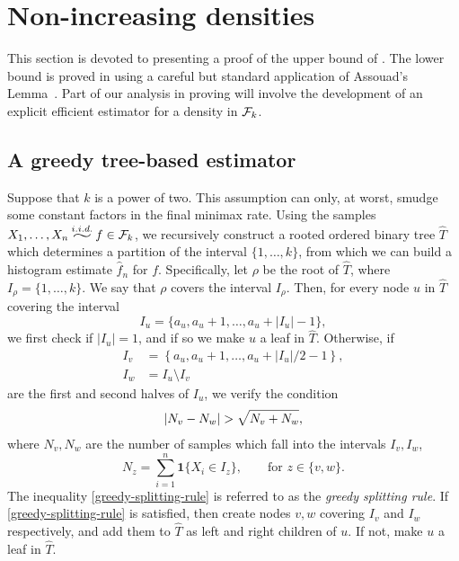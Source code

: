 \section{Non-increasing densities}

This section is devoted to presenting a proof of the upper bound of
. The lower bound is proved in
 using a careful but standard application of
Assouad's Lemma~\cite{assouad}. Part of our analysis in proving
 will involve the development of an explicit
efficient estimator for a density in $\mathcal{F}_k$.

\subsection{A greedy tree-based estimator}

Suppose that $k$ is a power of two. This assumption can only, at
worst, smudge some constant factors in the final minimax rate. Using
the samples $X_1, \dots, X_n \iid f \in \sF_k$, we recursively
construct a rooted ordered binary tree $\widehat{T}$ which determines
a partition of the interval $\{1, \dots, k\}$, from which we can build
a histogram estimate $\hat{f}_n$ for $f$. Specifically, let $\rho$ be
the root of $\widehat{T}$, where $I_\rho = \{1, \dots, k\}$. We say
that $\rho$ covers the interval $I_\rho$. Then, for every node $u$ in
$\widehat{T}$ covering the interval
\[
  I_u = \{a_u, a_u + 1, \dots, a_u + |I_u| - 1\} ,
\]
we first check if $|I_u| = 1$, and if so we make $u$ a leaf in
$\widehat{T}$. Otherwise, if
\begin{align*}
  I_v &= \left\{a_u, a_u + 1, \dots, a_u + |I_u|/2 - 1\right\} , \\
  I_w &= I_u \setminus I_v
\end{align*}
are the first and second halves of $I_u$, we verify the condition
\begin{align}
  |N_v - N_w| > \sqrt{N_v + N_w} , \eqlabel{greedy-splitting-rule}
\end{align}
where $N_v, N_w$ are the number of samples which fall into the
intervals $I_v, I_w$, \ie
\[
  N_z = \sum_{i = 1}^n \mathbf{1}\{X_i \in I_z\}, \qquad \text{for } z \in \{v, w\} .
\]
The inequality \eqref{greedy-splitting-rule} is referred to as the
\emph{greedy splitting rule}. If \eqref{greedy-splitting-rule} is
satisfied, then create nodes $v, w$ covering $I_v$ and $I_w$
respectively, and add them to $\widehat{T}$ as left and right children
of $u$. If not, make $u$ a leaf in $\widehat{T}$.

